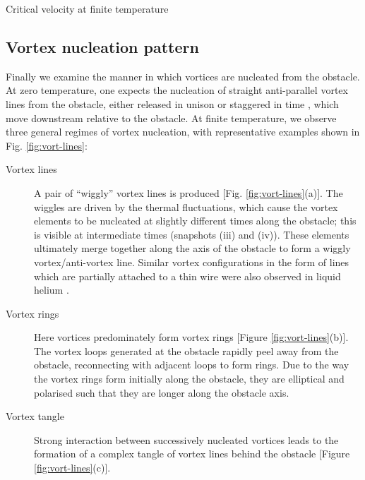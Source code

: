 \begin{chapter}{\label{cha:nonequib}Critical velocity at finite temperature}
\subsection{Vortex nucleation pattern}


Finally we examine the manner in which vortices are nucleated from the obstacle.  At zero temperature, one expects the nucleation of straight anti-parallel vortex lines from the obstacle, either released in unison or staggered in time \cite{frisch92,saito10,stagg_parker_14}, which move downstream relative to the obstacle.  At finite temperature, we observe three general regimes of vortex nucleation, with representative examples shown in Fig.  \ref{fig:vort-lines}:


\begin{description}
\item[Vortex lines] A pair of ``wiggly'' vortex lines is produced  [Fig.  \ref{fig:vort-lines}(a)].  The wiggles are driven by the thermal fluctuations, which cause the vortex elements to be nucleated at slightly different times along the obstacle; this is visible at intermediate times (snapshots (iii) and (iv)).   These elements ultimately merge together along the axis of the obstacle to form a wiggly vortex/anti-vortex line. Similar vortex configurations
in the form of lines which are partially attached to a thin wire 
were also observed in liquid helium \cite{zieve2001}. 
\item[Vortex rings]  Here vortices predominately form vortex
rings [Figure \ref{fig:vort-lines}(b)].  The vortex loops generated
at the obstacle rapidly peel away from the obstacle, reconnecting with
adjacent loops to form rings. Due to the way the vortex rings form initially along the obstacle, they are elliptical and polarised such that they are longer along the obstacle axis. 
\item[Vortex tangle]  Strong
interaction between successively nucleated vortices leads to the formation of a complex tangle of vortex lines behind the obstacle [Figure \ref{fig:vort-lines}(c)].
\end{description}



\end{chapter}
